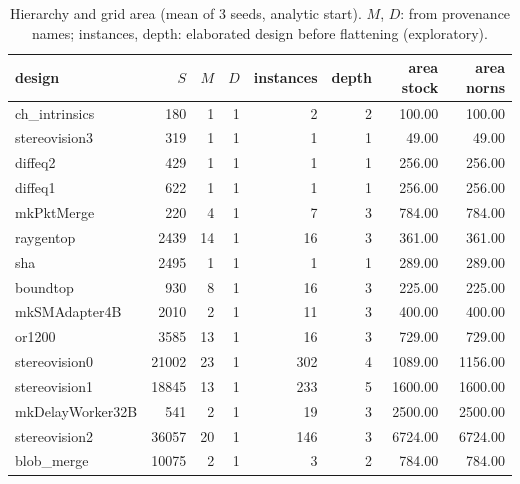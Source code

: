 \begin{table}[t]
\caption{Hierarchy and grid area (mean of 3 seeds, analytic start). $M$, $D$: from provenance names; instances, depth: elaborated design before flattening (exploratory).}
\label{tab:r4hier}
\centering\scriptsize\setlength{\tabcolsep}{3pt}
\begin{tabular}{@{}lrrrrrrr@{}}
\toprule
design & $S$ & $M$ & $D$ & instances & depth & area stock & area norns \\
\midrule
ch\_intrinsics & 180 & 1 & 1 & 2 & 2 & 100.00 & 100.00 \\
stereovision3 & 319 & 1 & 1 & 1 & 1 & 49.00 & 49.00 \\
diffeq2 & 429 & 1 & 1 & 1 & 1 & 256.00 & 256.00 \\
diffeq1 & 622 & 1 & 1 & 1 & 1 & 256.00 & 256.00 \\
mkPktMerge & 220 & 4 & 1 & 7 & 3 & 784.00 & 784.00 \\
raygentop & 2439 & 14 & 1 & 16 & 3 & 361.00 & 361.00 \\
sha & 2495 & 1 & 1 & 1 & 1 & 289.00 & 289.00 \\
boundtop & 930 & 8 & 1 & 16 & 3 & 225.00 & 225.00 \\
mkSMAdapter4B & 2010 & 2 & 1 & 11 & 3 & 400.00 & 400.00 \\
or1200 & 3585 & 13 & 1 & 16 & 3 & 729.00 & 729.00 \\
stereovision0 & 21002 & 23 & 1 & 302 & 4 & 1089.00 & 1156.00 \\
stereovision1 & 18845 & 13 & 1 & 233 & 5 & 1600.00 & 1600.00 \\
mkDelayWorker32B & 541 & 2 & 1 & 19 & 3 & 2500.00 & 2500.00 \\
stereovision2 & 36057 & 20 & 1 & 146 & 3 & 6724.00 & 6724.00 \\
blob\_merge & 10075 & 2 & 1 & 3 & 2 & 784.00 & 784.00 \\
\bottomrule
\end{tabular}
\end{table}

